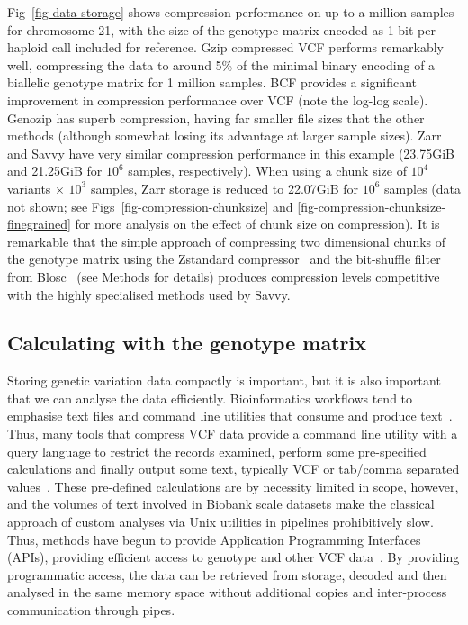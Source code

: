 \documentclass[a4paper,num-refs]{oup-contemporary}
\begin{document}
Fig~\ref{fig-data-storage} shows compression performance
on up to a million samples for chromosome 21, with
the size of the genotype-matrix encoded as 1-bit per haploid
call included for reference.
Gzip compressed VCF performs remarkably well, compressing
the data to around 5\% of the
minimal binary encoding of a biallelic genotype matrix
for 1 million samples.
BCF provides a significant improvement in compression
performance over VCF (note the log-log scale). Genozip has
superb compression, having far smaller file sizes that the
other methods (although somewhat losing its advantage at
larger sample sizes). Zarr and Savvy have
very similar compression performance in this example (23.75GiB
and 21.25GiB for $10^6$ samples, respectively). When using
a chunk size of $10^4$ variants $\times$ $10^3$ samples, Zarr
storage is reduced to 22.07GiB for $10^6$ samples (data not shown;
see Figs~\ref{fig-compression-chunksize} and \ref{fig-compression-chunksize-finegrained}
for more analysis on the effect of chunk size on compression).
It is remarkable that the simple approach of compressing
two dimensional chunks of the genotype matrix
using the Zstandard compressor~\citep{collet2021rfc} and the
bit-shuffle filter from Blosc~\cite{alted2010modern}
(see Methods for details) produces
compression levels competitive with the highly specialised methods
used by Savvy.

\subsection{Calculating with the genotype matrix}
Storing genetic variation data compactly is important, but it is also
important that we can analyse the data efficiently. Bioinformatics
workflows tend to emphasise text files and command line utilities
that consume and produce text~\citep[e.g.][]{buffalo2015bioinformatics}.
Thus, many tools that compress VCF data provide a command line
utility with a query language to restrict the records
examined, perform some pre-specified calculations and finally
output some text, typically VCF or tab/comma separated
values~\citep{
layer2016efficient, %
li2016bgt, %
danek2018gtc, %
lin2020sparse, %
lan2020genozip,lan2021genozip, %
zhang2023gbc}. %
These pre-defined calculations are by necessity limited in scope, however,
and the volumes of text involved in Biobank scale datasets
make the classical approach of custom
analyses via Unix utilities in pipelines prohibitively slow. Thus,
methods have begun to provide Application Programming Interfaces
(APIs), providing efficient access to genotype and other VCF
data~\cite[e.g.][]{kelleher2013processing,lefaive2021sparse,
wertenbroek2022xsi}. By providing programmatic access,
the data can be retrieved from storage, decoded and then analysed
in the same memory space without additional copies and
inter-process communication through pipes.
\end{document}
